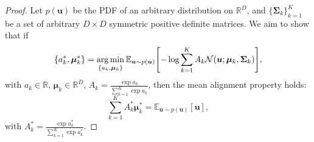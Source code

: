 \documentclass{article}
\def\vmu{{\bm{\mu}}}
\def\vu{{\bm{u}}}
\def\mSigma{{\bm{\Sigma}}}
\newcommand{\E}{\mathbb{E}}
\newcommand{\R}{\mathbb{R}}
\DeclareMathOperator*{\argmin}{arg\,min}
\theoremstyle{custom}
\theoremstyle{definition}
\theoremstyle{remark}
\let\originalleft\left
\let\originalright\right
\renewcommand{\left}{\mathopen{}\mathclose\bgroup\originalleft}
\renewcommand{\right}{\aftergroup\egroup\originalright}
\begin{document}
\begin{proof}
  Let $p(\vu)$ be the PDF of an arbitrary distribution on $\R^D$, and $\{\mSigma_k\}_{k=1}^{K}$ be a set of arbitrary $D\times D$ symmetric positive definite matrices. We aim to show that if
  \begin{equation}
      \{a_k^*, \vmu_k^*\} = \argmin_{\{a_k, \vmu_k\}} \E_{\vu \sim p(\vu)}\left[-\log \sum_{k=1}^K A_k \mathcal{N}(\vu; \vmu_k, \mSigma_k)\right],
  \end{equation}
  with $a_k \in \R$, $\vmu_k \in \R^D$, $A_k = \frac{\exp{a_k}}{\sum_{k=1}^K \exp{a_k}}$, then the mean alignment property holds:
  \begin{equation}
    \sum_{k=1}^K A_k^* \vmu_k^* = \E_{\vu \sim p(\vu)}[\vu],
  \end{equation}
  with $A_k^* = \frac{\exp{a_k^*}}{\sum_{k=1}^K \exp{a_k^*}}$.


\end{proof}
\end{document}
